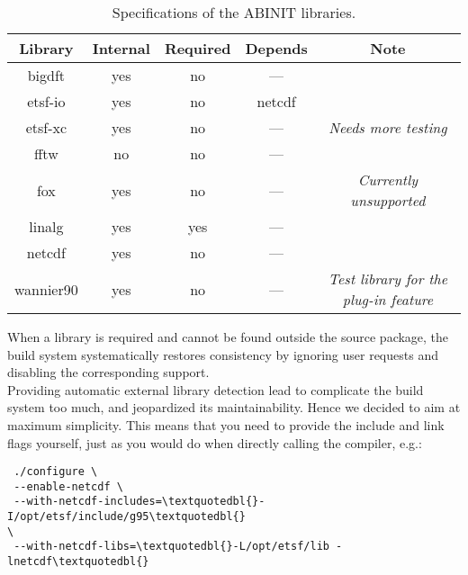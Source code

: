 %
\begin{table}
\begin{centering}
\begin{tabular}{|c|c|c|c|c|}
\hline 
\textbf{Library}  & \textbf{Internal}  & \textbf{Required}  & \textbf{Depends}  & \textbf{Note} \tabularnewline
\hline 
bigdft  & yes  & no  & ---  & \tabularnewline
\hline 
etsf-io  & yes  & no  & netcdf  & \tabularnewline
\hline 
etsf-xc  & yes  & no  & ---  & \textit{Needs more testing} \tabularnewline
\hline 
fftw  & no  & no  & ---  & \tabularnewline
\hline 
fox  & yes  & no  & ---  & \textit{Currently unsupported} \tabularnewline
\hline 
linalg  & yes  & yes  & ---  & \tabularnewline
\hline 
netcdf  & yes  & no  & ---  & \tabularnewline
\hline 
wannier90  & yes  & no  & ---  & \textit{Test library for the plug-in feature} \tabularnewline
\end{tabular}
\par\end{centering}

\caption{Specifications of the ABINIT libraries.}


\label{tab:dsc-extlibs} 
\end{table}


When a library is required and cannot be found outside the source
package, the build system systematically restores consistency by ignoring
user requests and disabling the corresponding support. \\


Providing automatic external library detection lead to complicate
the build system too much, and jeopardized its maintainability. Hence
we decided to aim at maximum simplicity. This means that you need
to provide the include and link flags yourself, just as you would
do when directly calling the compiler, e.g.:

{\small \begin{verbatim} ./configure \
 --enable-netcdf \
 --with-netcdf-includes=\textquotedbl{}-I/opt/etsf/include/g95\textquotedbl{}
\
 --with-netcdf-libs=\textquotedbl{}-L/opt/etsf/lib -lnetcdf\textquotedbl{}
\end{verbatim} }{\small \par}

